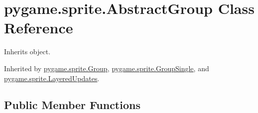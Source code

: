 \hypertarget{classpygame_1_1sprite_1_1_abstract_group}{}\section{pygame.\+sprite.\+Abstract\+Group Class Reference}
\label{classpygame_1_1sprite_1_1_abstract_group}


Inherits object.



Inherited by \hyperlink{classpygame_1_1sprite_1_1_group}{pygame.\+sprite.\+Group}, \hyperlink{classpygame_1_1sprite_1_1_group_single}{pygame.\+sprite.\+Group\+Single}, and \hyperlink{classpygame_1_1sprite_1_1_layered_updates}{pygame.\+sprite.\+Layered\+Updates}.

\subsection*{Public Member Functions}
